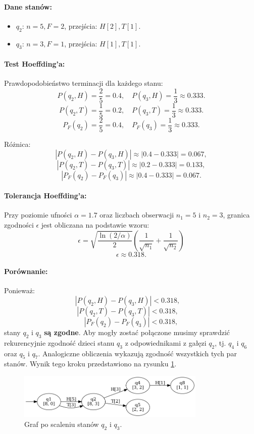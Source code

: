 \paragraph*{Dane stanów:}  
\begin{itemize}  
    \item \( q_2 \): \( n = 5, F = 2 \), przejścia: \( H[2], T[1] \).  
    \item \( q_3 \): \( n = 3, F = 1 \), przejścia: \( H[1], T[1] \).  
\end{itemize}  

\paragraph*{Test Hoeffding’a:}  
Prawdopodobieństwo terminacji dla każdego stanu:  
\[
P(q_2, H) = \frac{2}{5} = 0.4, \quad P(q_3, H) = \frac{1}{3} \approx 0.333.
\]
\[
P(q_2, T) = \frac{1}{5} = 0.2, \quad P(q_3, T) = \frac{1}{3} \approx 0.333.
\]
\[
P_F(q_2) = \frac{2}{5} = 0.4, \quad P_F(q_3) = \frac{1}{3} \approx 0.333.
\]

Różnica:  
\[
|P(q_2, H) - P(q_3, H)| \approx |0.4 - 0.333| = 0.067,
\]
\[
|P(q_2, T) - P(q_3, T)| \approx |0.2 - 0.333| = 0.133,
\]
\[
|P_F(q_2) - P_F(q_3)| \approx |0.4 - 0.333| = 0.067.
\]

\paragraph*{Tolerancja Hoeffding’a:}  
Przy poziomie ufności \( \alpha = 1.7 \) oraz liczbach obserwacji \( n_1 = 5 \) i \( n_2 = 3 \), granica zgodności \( \epsilon \) jest obliczana na podstawie wzoru:  
\[
\epsilon = \sqrt{\frac{\ln(2 / \alpha)}{2}} \left( \frac{1}{\sqrt{n_1}} + \frac{1}{\sqrt{n_2}} \right)
\]
\[
\epsilon \approx 0.318.
\]

\paragraph*{Porównanie:}  
Ponieważ:  
\[
|P(q_2, H) - P(q_3, H)| < 0.318, \quad
\]
\[
|P(q_2, T) - P(q_3, T)| < 0.318, \quad
\]
\[
|P_F(q_2) - P_F(q_3)| < 0.318,
\]  
stany \( q_2 \) i \( q_3 \) \textbf{są zgodne}. Aby mogły zostać połączone musimy sprawdzić rekurencyjnie zgodność dzieci stanu $q_3$ z odpowiednikami z gałęzi $q_2$, tj. $q_4$ i $q_6$ oraz $q_5$ i $q_7$. Analogiczne obliczenia wykazują zgodność wszystkich tych par stanów. Wynik tego kroku przedstawiono na rysunku \ref{fig:alergia_example_1}.  

\begin{figure}[ht]
    \centering
    \includegraphics[width=0.8\textwidth]{images/run_example/alergia/1.png}
    \caption{Graf po scaleniu stanów \( q_2 \) i \( q_3 \).}
    \label{fig:alergia_example_1}
\end{figure}

